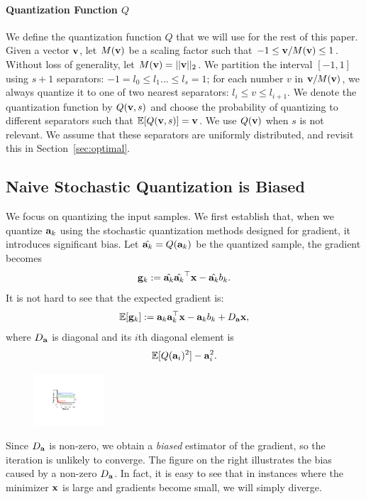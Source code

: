 \documentclass{article}
\def\a{{\bf a}}
\def\g{{\bf g}}
\def\x{{\bf x}}
\def\v{{\bf v}}
\def\E{\mathbb{E}}
\begin{document}
\paragraph*{Quantization Function $Q$} We define
the quantization function $Q$ that we will use
for the rest of this paper. Given a vector
$\v$, let $M(\v)$ be a scaling factor such that
$-1 \le \v/M(\v) \le 1$. Without loss of generality,
let $M(\v)=||\v||_2$. We partition
the interval $[-1, 1]$ using $s+1$ separators:
$-1 = l_0 \le l_1 ... \le l_{s} = 1$; for
each number $v$ in $\v/M(\v)$, we always 
quantize it to one of two nearest 
separators: $l_i \le v \le l_{i+1}$. 
We denote the quantization function by $Q(\v, s)$
and choose the probability of quantizing to
different separators such that $\E[Q(\v, s)] = \v$.
We use $Q(\v)$ when $s$ is not relevant.
We assume that these
separators are uniformly distributed,
and revisit this in Section~\ref{sec:optimal}.

\vspace{-1em}
\subsection{Naive Stochastic Quantization is Biased}

\vspace{-0.5em}
We focus on quantizing the input samples.
We first establish that, when we quantize $\a_k$
using the stochastic quantization methods designed
for gradient, it introduces significant bias.
Let $\hat{\a_k} = Q(\a_k)$ be the quantized
sample, the gradient becomes
\[
\g_k := \hat{\a_k} \hat{\a_k}^\top \x - \hat{\a_k} b_k.
\]
It is not hard to see that the expected gradient is: 
\[
\E[\g_k] := \a_k \a_k^\top \x - \a_k b_k + D_{\a} \x, 
\]
where $D_{\a}$ is diagonal and its $i$th diagonal element is 
\[
\E[ Q(\a_i)^2 ] - \a_i^2.
\]

\begin{figure}
  \begin{center}
    \includegraphics[width=0.23\textwidth]{micro-experiments/gap.pdf}
  \end{center}
  \label{fig:gap}
\end{figure}

Since $D_{\a}$ is non-zero, we obtain a \emph{biased} estimator of the gradient, so the iteration is unlikely to converge. 
The figure on the right illustrates the bias
caused by a non-zero $D_{\a}$.
In fact, it is easy to see that in instances where the minimizer $\x$ is large and gradients become small, we will simply diverge. 
\end{document}
